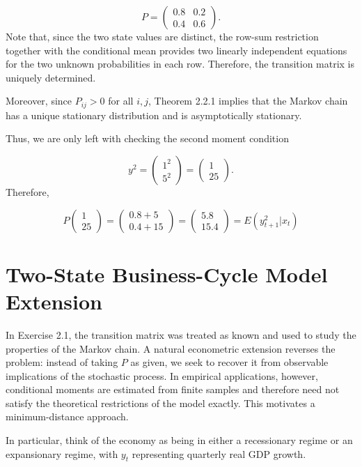 \documentclass[11pt]{article}
\begin{document}
\[
P=
\begin{pmatrix}
    0.8 & 0.2 \\
    0.4 & 0.6
\end{pmatrix}.
\]
Note that, since the two state values are distinct, the row-sum restriction together with
the conditional mean provides two linearly independent equations for the two
unknown probabilities in each row. Therefore, the transition matrix is uniquely
determined.

Moreover, since \(P_{ij}>0\) for all \(i,j\), Theorem 2.2.1 implies that the
Markov chain has a unique stationary distribution and is asymptotically stationary.

Thus, we are only left with checking the second moment condition

\[
y^2 = \begin{pmatrix}
    1^2 \\
    5^2
\end{pmatrix}= \begin{pmatrix}
    1 \\
    25
\end{pmatrix}.
\]
Therefore,

\[
P \begin{pmatrix}
    1 \\
    25
\end{pmatrix}= \begin{pmatrix}
    0.8 + 5\\
    0.4 + 15
\end{pmatrix} = \begin{pmatrix}
    5.8 \\
    15.4
\end{pmatrix}= E(y_{t+1}^2|x_t)
\]


\section*{Two-State Business-Cycle Model Extension}

In Exercise 2.1, the transition matrix was treated as known and used to study
the properties of the Markov chain. A natural econometric extension reverses
the problem: instead of taking \(P\) as given, we seek to recover it from
observable implications of the stochastic process. In empirical applications, however, conditional moments are estimated from
finite samples and therefore need not satisfy the theoretical restrictions of
the model exactly. This motivates a minimum-distance approach.

In particular, think of the economy as being in either a recessionary regime or an expansionary regime, with \(y_t\) representing quarterly real GDP growth.
\end{document}
